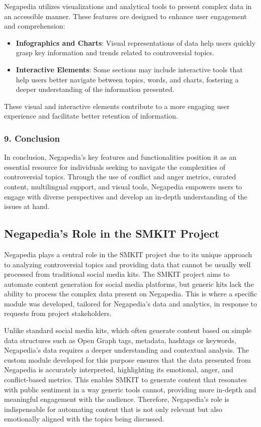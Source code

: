 Negapedia utilizes visualizations and analytical tools to present complex data in an accessible manner. These features are designed to enhance user engagement and comprehension:

\begin{itemize}
    \item \textbf{Infographics and Charts}: Visual representations of data help users quickly grasp key information and trends related to controversial topics.
    \item \textbf{Interactive Elements}: Some sections may include interactive tools that help users better navigate between topics, words, and charts, fostering a deeper understanding of the information presented.
\end{itemize}

These visual and interactive elements contribute to a more engaging user experience and facilitate better retention of information.

\subsubsection{9. Conclusion}

In conclusion, Negapedia’s key features and functionalities position it as an essential resource for individuals seeking to navigate the complexities of controversial topics. Through the use of conflict and anger metrics, curated content, multilingual support, and visual tools, Negapedia empowers users to engage with diverse perspectives and develop an in-depth understanding of the issues at hand.

\subsection{Negapedia's Role in the SMKIT Project}
\label{subsec:negapedia_s_role_in_the_smkit_project}

Negapedia plays a central role in the SMKIT project due to its unique approach to analyzing controversial topics and providing data that cannot be usually well processed from traditional social media kits. The SMKIT project aims to automate content generation for social media platforms, but generic kits lack the ability to process the complex data present on Negapedia. This is where a specific module was developed, tailored for Negapedia’s data and analytics, in response to requests from project stakeholders.

Unlike standard social media kits, which often generate content based on simple data structures such as Open Graph tags, metadata, hashtags or keywords, Negapedia’s data requires a deeper understanding and contextual analysis. The custom module developed for this purpose ensures that the data presented from Negapedia is accurately interpreted, highlighting its emotional, anger, and conflict-based metrics. This enables SMKIT to generate content that resonates with public sentiment in a way generic tools cannot, providing more in-depth and meaningful engagement with the audience. Therefore, Negapedia’s role is indispensable for automating content that is not only relevant but also emotionally aligned with the topics being discussed.


